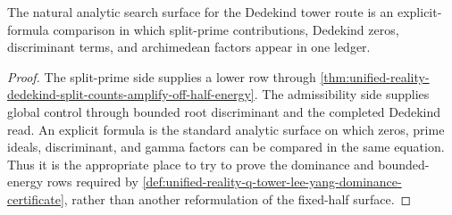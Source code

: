\begin{corollary}
\label{cor:unified-reality-explicit-formula-search-direction}
The natural analytic search surface for the Dedekind tower route is an
explicit-formula comparison in which split-prime contributions,
Dedekind zeros, discriminant terms, and archimedean factors appear in
one ledger.
\end{corollary}

\begin{proof}
The split-prime side supplies a lower row through
\autoref{thm:unified-reality-dedekind-split-counts-amplify-off-half-energy}.
The admissibility side supplies global control through bounded root
discriminant and the completed Dedekind read.  An explicit formula is
the standard analytic surface on which zeros, prime ideals,
discriminant, and gamma factors can be compared in the same equation.
Thus it is the appropriate place to try to prove the dominance and
bounded-energy rows required by
\autoref{def:unified-reality-q-tower-lee-yang-dominance-certificate},
rather than another reformulation of the fixed-half surface.
\end{proof}
